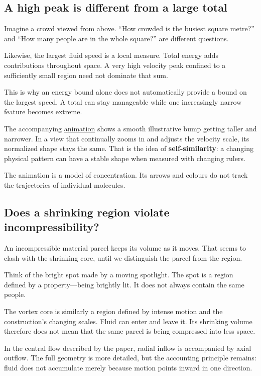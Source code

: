 \documentclass[
  english,
  11pt,
]{article}
\begin{document}
\subsection{A high peak is different from a large
total}\label{a-high-peak-is-different-from-a-large-total}

Imagine a crowd viewed from above. ``How crowded is the busiest square
metre?'' and ``How many people are in the whole square?'' are different
questions.

Likewise, the largest fluid speed is a local measure. Total energy adds
contributions throughout space. A very high velocity peak confined to a
sufficiently small region need not dominate that sum.

This is why an energy bound alone does not automatically provide a bound
on the largest speed. A total can stay manageable while one increasingly
narrow feature becomes extreme.

The accompanying \href{animations/core_collapse.html}{animation} shows a
smooth illustrative bump getting taller and narrower. In a view that
continually zooms in and adjusts the velocity scale, its normalized
shape stays the same. That is the idea of \textbf{self-similarity}: a
changing physical pattern can have a stable shape when measured with
changing rulers.

The animation is a model of concentration. Its arrows and colours do not
track the trajectories of individual molecules.

\subsection{Does a shrinking region violate
incompressibility?}\label{does-a-shrinking-region-violate-incompressibility}

An incompressible material parcel keeps its volume as it moves. That
seems to clash with the shrinking core, until we distinguish the parcel
from the region.

Think of the bright spot made by a moving spotlight. The spot is a
region defined by a property---being brightly lit. It does not always
contain the same people.

The vortex core is similarly a region defined by intense motion and the
construction's changing scales. Fluid can enter and leave it. Its
shrinking volume therefore does not mean that the same parcel is being
compressed into less space.

In the central flow described by the paper, radial inflow is accompanied
by axial outflow. The full geometry is more detailed, but the accounting
principle remains: fluid does not accumulate merely because motion
points inward in one direction.
\end{document}
